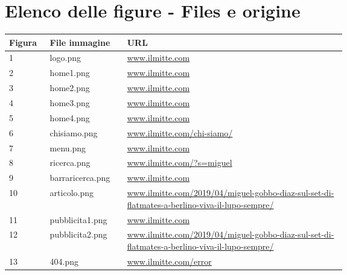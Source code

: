 \listoffigures
\section*{Elenco delle figure - Files e origine}
\vspace{8pt}
\begin{table}[htbp]  
\centering
\begin{tabular}{|l|l|p{0.65\linewidth}|}
\hline
\textbf{Figura} & \textbf{File immagine} & \textbf{URL}                                                                                          \\ \hline
1               & logo.png               & \href{http://www.ilmitte.com}{www.ilmitte.com} \\
2               & home1.png              & \href{http://www.ilmitte.com}{www.ilmitte.com} \\
3               & home2.png              & \href{http://www.ilmitte.com}{www.ilmitte.com}                                                                                           \\
4               & home3.png              & \href{http://www.ilmitte.com}{www.ilmitte.com} \\
5               & home4.png              & \href{http://www.ilmitte.com}{www.ilmitte.com} \\
6               & chisiamo.png               & \href{http://www.ilmitte.com/chi-siamo/}{www.ilmitte.com/chi-siamo/                                                                               } \\
7               & menu.png                   & \href{http://www.ilmitte.com}{www.ilmitte.com} \\
8               & ricerca.png                & \href{http://www.ilmitte.com/?s=miguel}{www.ilmitte.com/?s=miguel                                                                                } \\
9               & barraricerca.png           & \href{http://www.ilmitte.com}{www.ilmitte.com} \\
10              & articolo.png               & \href{http://www.ilmitte.com/2019/04/miguel-gobbo-diaz-sul-set-di-flatmates-a-berlino-viva-il-lupo-sempre/}{www.ilmitte.com/2019/04/miguel-gobbo-diaz-sul-set-di-flatmates-a-berlino-viva-il-lupo-sempre/}  \\
11              & pubblicita1.png            & \href{http://www.ilmitte.com}{www.ilmitte.com} \\
12              & pubblicita2.png            & \href{http://www.ilmitte.com/2019/04/miguel-gobbo-diaz-sul-set-di-flatmates-a-berlino-viva-il-lupo-sempre/}{www.ilmitte.com/2019/04/miguel-gobbo-diaz-sul-set-di-flatmates-a-berlino-viva-il-lupo-sempre/} \\
13              & 404.png                    & \href{http://www.ilmitte.com/error}{www.ilmitte.com/error} \\ \hline
\end{tabular}
\end{table}